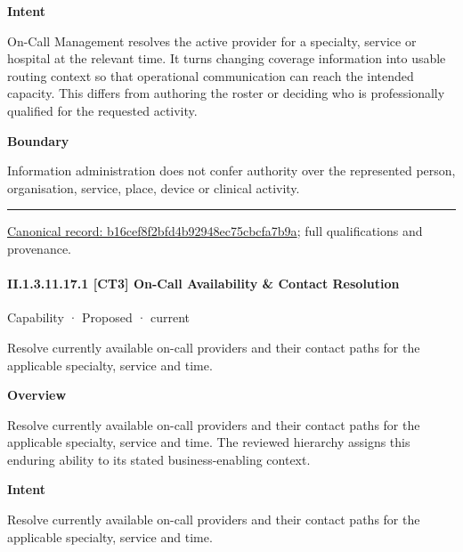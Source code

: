 \textbf{Intent}



On-Call Management resolves the active provider for a specialty, service or hospital at the relevant time. It turns changing coverage information into usable routing context so that operational communication can reach the intended capacity. This differs from authoring the roster or deciding who is professionally qualified for the requested activity.



\textbf{Boundary}



Information administration does not confer authority over the represented person, organisation, service, place, device or clinical activity.



\medskip\hrule\medskip

{\footnotesize \href{../../../../continuum/strategy/capability/b16cef8f2bfd4b92948ec75cbcfa7b9a.md}{Canonical record: b16cef8f2bfd4b92948ec75cbcfa7b9a}; full qualifications and provenance.}\par
\paragraph*{II.1.3.11.17.1 [CT3] On-Call Availability \& Contact Resolution}
\label{navigation:II.1.3.11.17.1}

\label{element:677a816c42414ea694791b4ee5a14285}
{\small Capability · Proposed · current}\par

Resolve currently available on-call providers and their contact paths for the applicable specialty, service and time.



\textbf{Overview}



Resolve currently available on-call providers and their contact paths for the applicable specialty, service and time. The reviewed hierarchy assigns this enduring ability to its stated business-enabling context.



\textbf{Intent}



Resolve currently available on-call providers and their contact paths for the applicable specialty, service and time.




